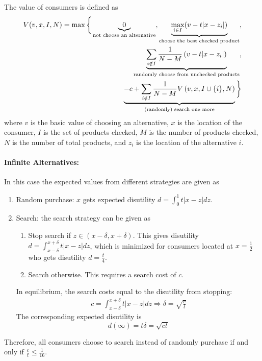 \documentclass[11pt]{elegantbook}
\begin{document}
The value of consumers is defined as
\begin{equation}
    \begin{aligned}
        V(v,x,I,N)=\max\bigg\{\underbrace{0}_\textnormal{not choose an alternative},\underbrace{\max_{i\in I}(v-t|x-z_i|)}_\textnormal{choose the best checked product},\\
        \underbrace{\sum_{i\notin I}\frac{1}{N-M}\left(v-t|x-z_i|\right)}_\textnormal{randomly choose from unchecked products},\\
        \underbrace{-c+\sum_{i\notin I}\frac{1}{N-M}V\left(v,x,I\cup\{i\},N\right)}_\textnormal{(randomly) search one more}\bigg\}
    \end{aligned}
    \nonumber
\end{equation}
where $v$ is the basic value of choosing an alternative, $x$ is the location of the consumer, $I$ is the set of products checked, $M$ is the number of products checked, $N$ is the number of total products, and $z_i$ is the location of the alternative $i$.


\paragraph*{Infinite Alternatives:} In this case the expected values from different strategies are given as
\begin{enumerate}
    \item Random purchase: $x$ gets expected disutility $d=\int_0^1 t|x-z| dz$.
    \item Search: the search strategy can be given as
    \begin{enumerate}
        \item Stop search if $z\in (x-\delta,x+\delta)$. This gives disutility $d=\int_{x-\delta}^{x+\delta}t|x-z|dz$, which is minimized for consumers located at $x=\frac{1}{2}$ who gets disutility $d=\frac{t}{4}$.
        \item Search otherwise. This requires a search cost of $c$.
    \end{enumerate}
    In equilibrium, the search costs equal to the disutility from stopping:
    \begin{equation}
        \begin{aligned}
            c=\int_{x-\delta}^{x+\delta}t|x-z|dz \Rightarrow \delta=\sqrt{\frac{c}{t}}
        \end{aligned}
        \nonumber
    \end{equation}
    The corresponding expected disutility is $$d(\infty)=t\delta=\sqrt{ct}$$
\end{enumerate}
Therefore, all consumers choose to search instead of randomly purchase if and only if $\frac{c}{t}\leq \frac{1}{16}$.
\end{document}
